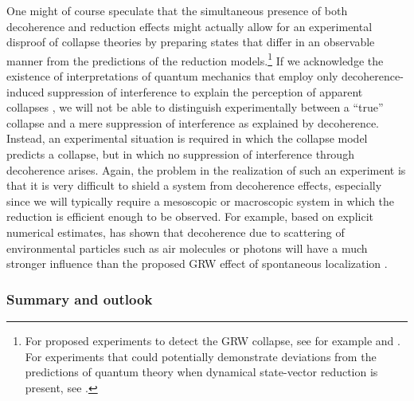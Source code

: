 \documentclass[twocolumn,rmp,aps,amsmath,amsfonts,noshowkeys,noshowpacs]{revtex4}
\newcommand{\cf}{cf.\ }
\begin{document}
One might of course speculate that the simultaneous presence of both
decoherence and reduction effects might actually allow for an
experimental disproof of collapse theories by preparing states that
differ in an observable manner from the predictions of the reduction
models.\footnote{For proposed experiments to detect the GRW collapse,
  see for example \citet{Squires:1991:az} and \citet{Rae:1990:wa}. For
  experiments that could potentially demonstrate deviations from the
  predictions of quantum theory when dynamical state-vector reduction
  is present, see \citet{Pearle:1984:qz,Pearle:1986:po}.} If we
acknowledge the existence of interpretations of quantum mechanics that
employ only decoherence-induced suppression of interference to explain
the perception of apparent collapses \citetext{as is, for example,
  claimed by the ``existential interpretation'' of
  \citealp{Zurek:1993:pu,Zurek:1998:re}; see
  Sec.~\ref{sec:exist-interpret}}, we will not be able to distinguish
experimentally between a ``true'' collapse and a mere suppression of
interference as explained by decoherence.  Instead, an experimental
situation is required in which the collapse model predicts a collapse,
but in which no suppression of interference through decoherence
arises. Again, the problem in the realization of such an experiment is
that it is very difficult to shield a system from decoherence effects,
especially since we will typically require a mesoscopic or macroscopic
system in which the reduction is efficient enough to be observed.  For
example, based on explicit numerical estimates,
\citet{Tegmark:1993:uz} has shown that decoherence due to scattering
of environmental particles such as air molecules or photons will have
a much stronger influence than the proposed GRW effect of spontaneous
localization \citetext{see also
  \citealp{Bassi:2003:yb,Benatti:1995:re}; for different results for
  energy-driven reduction models, \cf \citealp{Adler:2002:rc}}.

\subsubsection{Summary and outlook} 
\end{document}
